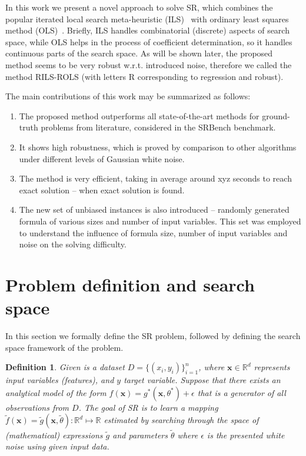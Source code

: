 \documentclass[a4paper,12pt]{elsarticle}
\newtheorem{definition}{Definition}
\begin{document}
    In this work we present a novel approach to solve SR, which combines the popular iterated local search meta-heuristic (ILS)~\cite{lourencco2003iterated,lourencco2019iterated} with ordinary least squares method (OLS)~\cite{leng2007ordinary}. Briefly, ILS handles combinatorial (discrete) aspects of search space, while OLS helps in the process of coefficient determination, so it handles continuous parts of the search space. As will be shown later, the proposed method seems to be very robust w.r.t. introduced noise, therefore we called the method RILS-ROLS (with letters R corresponding to regression and robust).  
 
The main contributions of this work may be summarized as follows:

\begin{enumerate}
	\item The proposed method outperforms all state-of-the-art methods for ground-truth problems from literature, considered in the SRBench benchmark. 
	
	\item It shows high robustness, which is proved by comparison to other algorithms under different levels of Gaussian white noise. 
	
	\item The method is very efficient, taking in average around xyz seconds to reach exact solution -- when exact solution is found. 
	
	\item The new set of unbiased instances is also introduced -- randomly generated formula of various sizes and number of input variables. This set was employed to understand the influence of formula size, number of input variables and noise on the solving difficulty. 
\end{enumerate}


\section{Problem definition and search space}
\label{sec:search-space}
In this section we formally define the SR problem, followed by defining the search space framework of the problem. 

\begin{definition}
  Given is a dataset $D = \{(x_i, y_i)\}_{i=1}^n$, where $\textbf{x} \in \mathbb{R}^d$ represents input variables (features), and $y$ target variable. Suppose that there exists an analytical model of the form $f(\textbf{x})= g^*(\textbf{x}, \theta^*) + \epsilon $ that is a generator of all observations from $D$.  
   The goal of SR is to learn a mapping $\tilde{f}(\textbf{x})=  \tilde{g}(\textbf{x}, \tilde{\theta})  \colon \mathbb{R}^d \mapsto \mathbb{R}$  estimated by searching through the space of (mathematical) expressions  $\tilde{g}$ and parameters $\tilde{\theta}$ where  $\epsilon$ is the presented  white noise using given input data. 
  
\end{definition}
\end{document}
